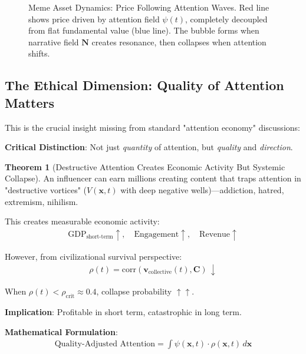 \documentclass[11pt,a4paper]{article}
\theoremstyle{definition}
\newtheorem{theorem}{Theorem}[section]
\theoremstyle{remark}
\begin{document}
\begin{small}
\begin{figure}[H]
\caption{Meme Asset Dynamics: Price Following Attention Waves. Red line shows price driven by attention field \(\psi(t)\), completely decoupled from flat fundamental value (blue line). The bubble forms when narrative field \(\mathbf{N}\) creates resonance, then collapses when attention shifts.}
\label{fig:meme_stock_dynamics}
\end{figure}

\subsection{The Ethical Dimension: Quality of Attention Matters}

This is the crucial insight missing from standard "attention economy" discussions:

\begin{mdframed}[backgroundcolor=yellow!10,linewidth=2pt]
\textbf{Critical Distinction}: Not just \textit{quantity} of attention, but \textit{quality} and \textit{direction}.

\begin{theorem}[Destructive Attention Creates Economic Activity But Systemic Collapse]
An influencer can earn millions creating content that traps attention in "destructive vortices" (\(V(\mathbf{x}, t)\) with deep negative wells)—addiction, hatred, extremism, nihilism.

This creates measurable economic activity:
\begin{align}
\text{GDP}_{\text{short-term}} \uparrow, \quad \text{Engagement} \uparrow, \quad \text{Revenue} \uparrow
\end{align}

However, from civilizational survival perspective:
\begin{align}
\rho(t) = \text{corr}(\mathbf{v}_{\text{collective}}(t), \mathbf{C}) \, \downarrow
\end{align}

When \(\rho(t) < \rho_{\text{crit}} \approx 0.4\), collapse probability \(\uparrow \uparrow\).

\textbf{Implication}: Profitable in short term, catastrophic in long term.
\end{theorem}

\textbf{Mathematical Formulation}:
\begin{align}
\text{Quality-Adjusted Attention} = \int \psi(\mathbf{x},t) \cdot \rho(\mathbf{x},t) \, d\mathbf{x}
\end{align}


\end{mdframed}
\end{small}
\end{document}
